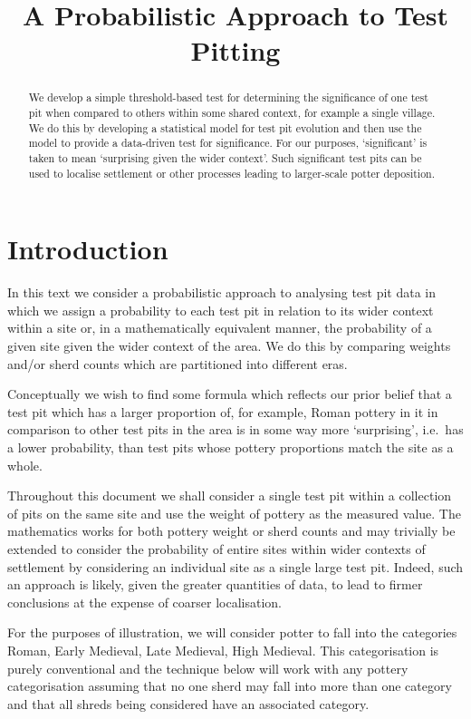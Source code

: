 \documentclass[conference]{IEEEtran}
\title{A Probabilistic Approach to Test Pitting}
\author{%
    \IEEEauthorblockN{Rich Wareham}
    \IEEEauthorblockA{Signal Processing and Communications Laboratory\\
    Department of Engineering, University of Cambridge\\
    Email: rjw57@cam.ac.uk}
}
\begin{document}
\maketitle

\begin{abstract}
    We develop a simple threshold-based test for determining the significance of
    one test pit when compared to others within some shared context, for example
    a single village. We do this by developing a statistical model for test pit
    evolution and then use the model to provide a data-driven test for
    significance. For our purposes, `significant' is taken to mean `surprising
    given the wider context'. Such significant test pits can be used to localise
    settlement or other processes leading to larger-scale potter deposition.
\end{abstract}

\section{Introduction}

In this text we consider a probabilistic approach to analysing test pit data in
which we assign a probability to each test pit in relation to its wider context
within a site or, in a mathematically equivalent manner, the probability of a
given site given the wider context of the area. We do this by comparing weights
and/or sherd counts which are partitioned into different eras.

Conceptually we wish to find some formula which reflects our prior belief that a
test pit which has a larger proportion of, for example, Roman pottery in it in
comparison to other test pits in the area is in some way more `surprising',
i.e.\ has a lower probability, than test pits whose pottery proportions match
the site as a whole.

Throughout this document we shall consider a single test pit within a collection
of pits on the same site and use the weight of pottery as the measured value.
The mathematics works for both pottery weight or sherd counts and may trivially
be extended to consider the probability of entire sites within wider contexts of
settlement by considering an individual site as a single large test pit. Indeed,
such an approach is likely, given the greater quantities of data, to lead to
firmer conclusions at the expense of coarser localisation.

For the purposes of illustration, we will consider potter to fall into the
categories Roman, Early Medieval, Late Medieval, High Medieval. This
categorisation is purely conventional and the technique below will work with any
pottery categorisation assuming that no one sherd may fall into more than one
category and that all shreds being considered have an associated category.
\end{document}
